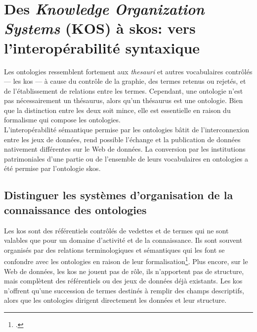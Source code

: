 \section{\label{II-B-2}Des \textit{Knowledge Organization Systems} (KOS) à \ac{skos}: vers l'interopérabilité syntaxique}

Les ontologies ressemblent fortement aux \textit{thesauri} et autres vocabulaires contrôlés --- les \ac{kos} --- à cause du contrôle de la graphie, des termes retenus ou rejetés, et de l'établissement de relations entre les termes. Cependant, une ontologie n'est pas nécessairement un thésaurus, alors qu'un thésaurus est une ontologie. Bien que la distinction entre les deux soit mince, elle est essentielle en raison du formalisme qui compose les ontologies.\\

L'interopérabilité sémantique permise par les ontologies bâtit de l'interconnexion entre les jeux de données, rend possible l'échange et la publication de données nativement différentes sur le Web de données. La conversion par les institutions patrimoniales d'une partie ou de l'ensemble de leurs vocabulaires en ontologies a été permise par l'ontologie \ac{skos}.

\subsection{\label{II-B-2-a}Distinguer les systèmes d'organisation de la connaissance des ontologies}

Les \ac{kos} sont des référentiels contrôlés de vedettes et de termes qui ne sont valables que pour un domaine d'activité et de la connaissance. Ils sont souvent organisés par des relations terminologiques et sémantiques qui les font se confondre avec les ontologies en raison de leur formalisation\footcite[p.48]{dalbin_approches_2011}. Plus encore, sur le Web de données, les \ac{kos} ne jouent pas de rôle, ils n'apportent pas de structure, mais complètent des référentiels ou des jeux de données déjà existants. Les \ac{kos} n'offrent qu'une succession de termes destinés à remplir des champs descriptifs, alors que les ontologies dirigent directement les données et leur structure.\\

